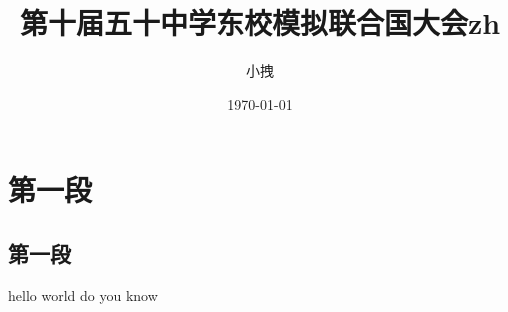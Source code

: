 \documentclass{article}
\title{第十届五十中学东校模拟联合国大会zh}
\date{\today}
\author{小拽}
\begin{document}
\maketitle
\section{第一段}
\subsection{第一段}
hello world do you know
\end{document}
